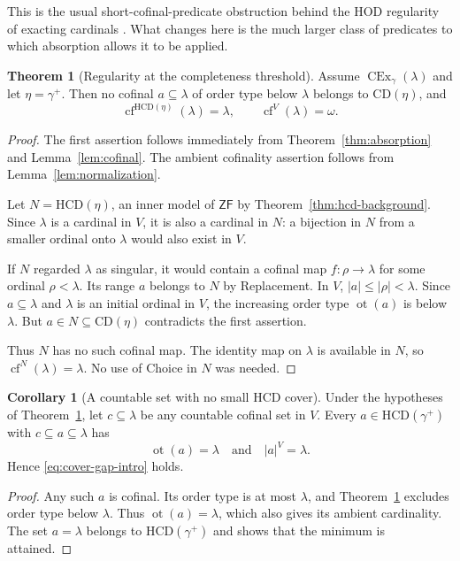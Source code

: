 \documentclass[11pt,letterpaper]{article}
\theoremstyle{definition}
\newtheorem{theorem}[definition]{Theorem}
\newtheorem{corollary}[definition]{Corollary}
\newcommand{\ZF}{\mathsf{ZF}}
\newcommand{\CEx}{\operatorname{CEx}}
\newcommand{\cf}{\operatorname{cf}}
\newcommand{\ot}{\operatorname{ot}}
\newcommand{\CD}{\mathrm{CD}}
\newcommand{\HCD}{\mathrm{HCD}}
\begin{document}
This is the usual short-cofinal-predicate obstruction behind the HOD regularity of exacting cardinals \cite[Observation 1]{cover}. What changes here is the much larger class of predicates to which absorption allows it to be applied.

\begin{theorem}[Regularity at the completeness threshold]\label{thm:regularity}
Assume $\CEx_\gamma(\lambda)$ and let $\eta=\gamma^+$. Then no cofinal $a\subseteq\lambda$ of order type below $\lambda$ belongs to $\CD(\eta)$, and
\begin{equation}\label{eq:regularity}
\cf^{\HCD(\eta)}(\lambda)=\lambda,
\qquad \cf^V(\lambda)=\omega.
\end{equation}
\end{theorem}
\begin{proof}
The first assertion follows immediately from Theorem~\ref{thm:absorption} and Lemma~\ref{lem:cofinal}. The ambient cofinality assertion follows from Lemma~\ref{lem:normalization}.

Let $N=\HCD(\eta)$, an inner model of $\ZF$ by Theorem~\ref{thm:hcd-background}. Since $\lambda$ is a cardinal in $V$, it is also a cardinal in $N$: a bijection in $N$ from a smaller ordinal onto $\lambda$ would also exist in $V$.

If $N$ regarded $\lambda$ as singular, it would contain a cofinal map $f:\rho\to\lambda$ for some ordinal $\rho<\lambda$. Its range $a$ belongs to $N$ by Replacement. In $V$, $|a|\le|\rho|<\lambda$. Since $a\subseteq\lambda$ and $\lambda$ is an initial ordinal in $V$, the increasing order type $\ot(a)$ is below $\lambda$. But $a\in N\subseteq\CD(\eta)$ contradicts the first assertion.

Thus $N$ has no such cofinal map. The identity map on $\lambda$ is available in $N$, so $\cf^N(\lambda)=\lambda$. No use of Choice in $N$ was needed.
\end{proof}

\begin{corollary}[A countable set with no small HCD cover]\label{cor:cover-gap}
Under the hypotheses of Theorem~\ref{thm:regularity}, let $c\subseteq\lambda$ be any countable cofinal set in $V$. Every $a\in\HCD(\gamma^+)$ with $c\subseteq a\subseteq\lambda$ has
\[
\ot(a)=\lambda\quad\text{and}\quad |a|^V=\lambda.
\]
Hence \eqref{eq:cover-gap-intro} holds.
\end{corollary}
\begin{proof}
Any such $a$ is cofinal. Its order type is at most $\lambda$, and Theorem~\ref{thm:regularity} excludes order type below $\lambda$. Thus $\ot(a)=\lambda$, which also gives its ambient cardinality. The set $a=\lambda$ belongs to $\HCD(\gamma^+)$ and shows that the minimum is attained.
\end{proof}
\end{document}
